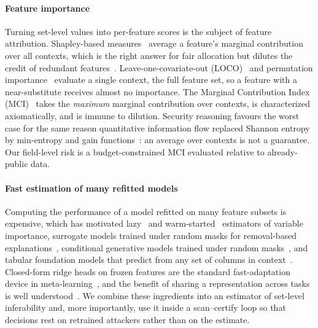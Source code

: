 \paragraph{Feature importance}
Turning set-level values into per-feature scores is the subject of feature attribution.
Shapley-based measures~\cite{shapley1953value,lundberg2017shap,covert2020sage,williamson2020spvim}
average a feature's marginal contribution over all contexts, which is the right answer for
fair allocation but dilutes the credit of redundant features~\cite{kumar2020shapley,catav2021mci}.
Leave-one-covariate-out (LOCO)~\cite{lei2018loco} and permutation importance~\cite{breiman2001rf,fisher2019mcr,hooker2021unrestricted}
evaluate a single context, the full feature set, so a feature with a near-substitute receives
almost no importance. The Marginal Contribution Index (MCI)~\cite{catav2021mci} takes the
\emph{maximum} marginal contribution over contexts, is characterized axiomatically, and is
immune to dilution. Security reasoning favours the worst case for the same reason
quantitative information flow replaced Shannon entropy by min-entropy and gain
functions~\cite{smith2009qif,alvim2012gleakage}: an average over contexts is not a guarantee.
Our field-level risk is a budget-constrained MCI evaluated relative to already-public data.

\paragraph{Fast estimation of many refitted models}
Computing the performance of a model refitted on many feature subsets is expensive, which has
motivated lazy~\cite{gao2022lazyvi} and warm-started~\cite{sun2025warmstart} estimators of
variable importance, surrogate models trained under random masks for removal-based
explanations~\cite{covert2021explaining,jethani2022fastshap,covert2023vitshapley}, conditional generative models trained under
random masks~\cite{ivanov2019vaeac,li2020acflow,yoon2020vime,he2022mae}, and tabular foundation models that predict from any
set of columns in context~\cite{hollmann2025tabpfn}.
Closed-form ridge heads on frozen features are the standard fast-adaptation device in
meta-learning~\cite{bertinetto2019r2d2,lee2019metaoptnet}, and the benefit of sharing a
representation across tasks is well understood~\cite{caruana1997multitask,baxter2000inductive,maurer2016benefit}.
We combine these ingredients into an estimator of set-level inferability and, more
importantly, use it inside a scan--certify loop so that decisions rest on retrained
attackers rather than on the estimate.

